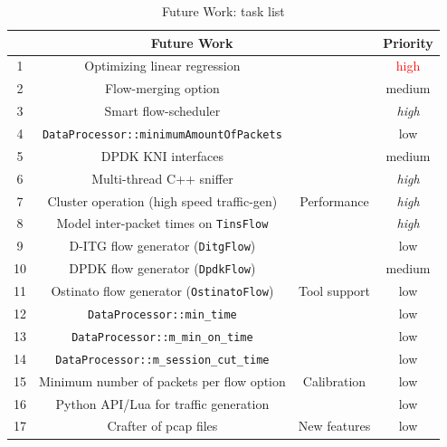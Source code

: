 \begin{table}[ht!]
	\centering
	\caption{Future Work: task list}
	\label{tab:task-list}
	\begin{tabular}{cccc}
		\hline
		\multicolumn{3}{c}{Future Work}	& Priority \\ \hline
		1   & Optimizing linear regression                      &                                & \textcolor{red}{high} \\
		2   & Flow-merging option                               &                                & medium \\
		3   & Smart flow-scheduler                              &                                & \textit{high} \\
		4   & \texttt{DataProcessor::minimumAmountOfPackets}    &                                & low \\
		5   & DPDK KNI interfaces                               &                                & medium \\
		6   & Multi-thread C++ sniffer                          &                                & \textit{high} \\ \hline
		7   & Cluster operation (high speed traffic-gen) & \multirow{-7}{*}{Performance}  & \textit{high} \\
		8   & Model inter-packet times on \texttt{TinsFlow}     &                                & \textit{high} \\
		9   & D-ITG flow generator (\texttt{DitgFlow})          &                                & low \\
		10  & DPDK flow generator (\texttt{DpdkFlow})           &                                & medium \\
		11  & Ostinato flow generator (\texttt{OstinatoFlow})   & \multirow{-4}{*}{Tool support} & low \\ \hline
		12  & \texttt{DataProcessor::min\_time}                 &                                & low \\
		13  & \texttt{DataProcessor::m\_min\_on\_time}          &                                & low \\
		14  & \texttt{DataProcessor::m\_session\_cut\_time}     &                                & low \\
		15  & Minimum number of packets per flow option         & \multirow{-4}{*}{Calibration}  & low \\ \hline
		16  & Python API/Lua for traffic generation             &                                & low \\
		17  & Crafter of  pcap files                            & \multirow{-2}{*}{New features} & low \\

		\hline
	\end{tabular}
\end{table}



